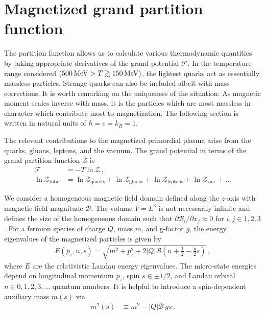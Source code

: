 \documentclass[epjST]{svjour}
\newcommand*{\MeV}{\text{\,MeV}}
\begin{document}
\section{Magnetized grand partition function}
\label{sec:partition}
The partition function allows us to calculate various thermodynamic quantities by taking appropriate derivatives of the grand potential $\mathcal{F}$. In the temperature range considered $(500\MeV>T\gtrsim150\MeV)$, the lightest quarks act as essentially massless particles. Strange quarks can also be included albeit with mass corrections. It is worth remarking on the uniqueness of the situation: As magnetic moment scales inverse with mass, it is the particles which are most massless in character which contribute most to magnetization. The following section is written in natural units of \(\hbar=c=k_{B}=1\).

The relevant contributions to the magnetized primordial plasma arise from the quarks, gluons, leptons, and the vacuum. The grand potential in terms of the grand partition function $\mathcal{Z}$ is
\begin{align}
\label{eq:parts}
\mathcal{F} &= -T\ln\mathcal{Z}\,,\\
\ln\mathcal{Z}_{\mathrm{total}} &=
\ln\mathcal{Z}_{\mathrm{quarks}} +
\ln\mathcal{Z}_{\mathrm{gluons}} +
\ln\mathcal{Z}_{\mathrm{leptons}}+
\ln\mathcal{Z}_{\mathrm{vac.}}+\ldots 
\end{align}

We consider a homogeneous magnetic field domain defined along the $z$-axis with magnetic field magnitude $\mathcal{B}$. The volume $V=L^{3}$ is not necessarily infinite and defines the size of the homogeneous domain such that $\partial\mathcal{B}_{i}/\partial x_{j}\approx0$ for \(i,j \in {1,2,3}\). For a fermion species of charge $Q$, mass $m$, and g-factor $g$, the energy eigenvalues of the magnetized particles is given by~\cite{Steinmetz:2018ryf}
\begin{align}
\label{eq:energystates}
E(p_{z},n,s)=\sqrt{m^{2}+p_{z}^{2}+2|Q|\mathcal{B}\left(n+\frac{1}{2}-\frac{g}{2}s\right)}\,,
\end{align}
where $E$ are the relativistic Landau energy eigenvalues. The micro-state energies depend on longitudinal momentum \(p_{z}\), spin $s\in\pm1/2$, and Landau orbital $n\in0,1,2,3,\ldots$ quantum numbers. It is helpful to introduce a spin-dependent auxiliary mass $m(s)$ via
\begin{align}
\label{eq:spinmass}
m^{2}(s) &\equiv m^{2} - |Q|\mathcal{B}\,g s\,.
\end{align}
\end{document}
